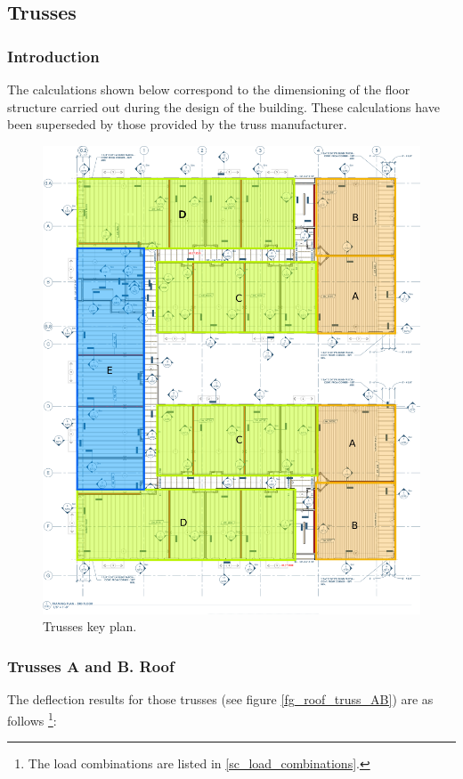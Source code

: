 \subsection{Trusses}

\subsubsection{Introduction}
The calculations shown below correspond to the dimensioning of the floor structure carried out during the design of the building. These calculations have been superseded by those provided by the truss manufacturer.

\begin{figure}
  \begin{center}
  \includegraphics[width=120mm]{figures/trusses/3rd_floor_truss_key_plan}
  \end{center}
  \caption{Trusses key plan.}\label{fg_3rd_floor_truss_key_plan}
\end{figure}

\subsubsection{Trusses A and B. Roof}
The deflection results for those trusses (see figure \ref{fg_roof_truss_AB}) are as follows \footnote{The load combinations are listed in \ref{sc_load_combinations}.}:


